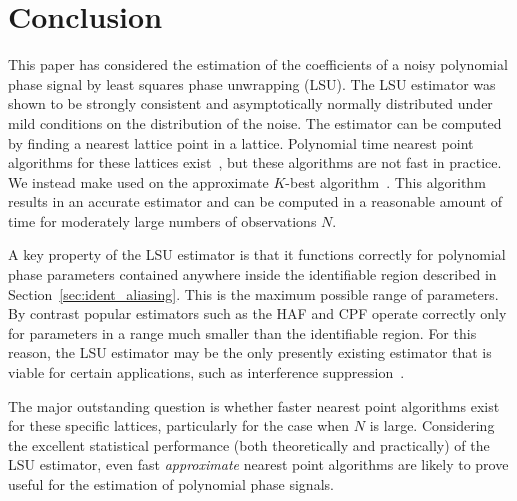 \documentclass[journal]{IEEEtran}
\begin{document}



 
\section{Conclusion} \label{sec:conclusion}
 
This paper has considered the estimation of the coefficients of a noisy polynomial phase signal by least squares phase unwrapping (LSU). The LSU estimator was shown to be strongly consistent and asymptotically normally distributed under mild conditions on the distribution of the noise.  The estimator can be computed by finding a nearest lattice point in a lattice. Polynomial time nearest point algorithms for these lattices exist~\cite[Sec 4.3]{McKilliam2010thesis}, but these algorithms are not fast in practice.  We instead make used on the approximate $K$-best algorithm~\cite{Baro_list_sphere_dec_2003,Zhan2006_K_best_sphere_decoder,Mondal_Kbest_again_2009}.  This algorithm results in an accurate estimator and can be computed in a reasonable amount of time for moderately large numbers of observations $N$. 

A key property of the LSU estimator is that it functions correctly for polynomial phase parameters contained anywhere inside the identifiable region described in Section~\ref{sec:ident_aliasing}.  This is the maximum possible range of parameters.  By contrast popular estimators such as the HAF and CPF operate correctly only for parameters in a range much smaller than the identifiable region.  For this reason, the LSU estimator may be the only presently existing estimator that is viable for certain applications, such as interference suppression~\cite{Djukanovic:2011:PMN:1950994.1951252,Djurovic_aliasing_2012}. 

The major outstanding question is whether faster nearest point algorithms exist for these specific lattices, particularly for the case when $N$ is large.  Considering the excellent statistical performance (both theoretically and practically) of the LSU estimator, even fast \emph{approximate} nearest point algorithms are likely to prove useful for the estimation of polynomial phase signals. 

\nocite{OShea_refiningpps_2010}
 
\small 
 


\normalsize
\end{document}
